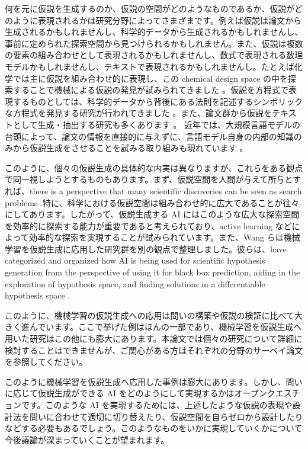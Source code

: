 何を元に仮説を生成するのか、仮説の空間がどのようなものであるか、仮説がどのように表現されるかは研究分野によってさまざまです。例えば仮説は論文から生成されるかもしれませんし、科学的データから生成されるかもしれませんし、事前に定められた探索空間から見つけられるかもしれません。また、仮説は複数の要素の組み合わせとして表現されるかもしれませんし、数式で表現される数理モデルかもしれませんし、テキストで表現されるかもしれませんし。たとえば化学では主に仮説を組み合わせ的に表現し、この chemical design space の中を探索することで機械による仮説の発見が試みられてきました \cite{coley2020autonomous}。仮説を方程式で表現するものとしては、科学的データから背後にある法則を記述するシンボリックな方程式を発見する研究が行われてきました \cite{kramer2023automated}。また、論文群から仮説をテキストとして生成・抽出する研究も多くあります \cite{kang2022augmenting,chan2018solvent,wang2023learning,xu2023exploring,yang2023large}。
近年では、大規模言語モデルの台頭によって、論文の情報を直接的に与えずに、言語モデル自身の内部の知識のみから仮説生成をさせることを試みる取り組みも現れています \cite{park2023can}。

このように、個々の仮説生成の具体的な内実は異なりますが、これらをある観点で同一視しようとするものもあります。まず、仮説空間を人間が与えて所与とすれば、there is a perspective that many scientific discoveries can be seen as search problems \cite{coley2020autonomous}.特に、科学における仮説空間は組み合わせ的に広大であることが往々にしてあります。したがって、仮説生成する AI にはこのような広大な探索空間を効率的に探索する能力が重要であると考えられており、active learning などによって効率的な探索を実現することが試みられています。また、Wang らは機械学習を仮説生成に応用した研究群を別の観点で整理しました。彼らは、have categorized and organized how AI is being used for scientific hypothesis generation from the perspective of using it for black box prediction, aiding in the exploration of hypothesis space, and finding solutions in a differentiable hypothesis space \cite{wang2023scientific}.

このように、機械学習の仮説生成への応用は問いの構築や仮説の検証に比べて大きく進んでいます。ここで挙げた例はほんの一部であり、機械学習を仮説生成へ用いた研究はこの他にも膨大にあります。本論文では個々の研究について詳細に検討することはできませんが、ご関心がある方はそれぞれの分野のサーベイ論文を参照してください。

このように機械学習を仮説生成へ応用した事例は膨大にあります。しかし、問いに応じて仮説生成ができる AI をどのようにして実現するかはオープンクエスチョンです。このような AI を実現するためには、上述したような仮説の表現や設計法を問いに合わせて適切に切り替えたり、仮説空間を自らゼロから設計したり \cite{coley2020autonomousII} などする必要もあるでしょう。このようなものをいかに実現していくかについて今後議論が深まっていくことが望まれます。

